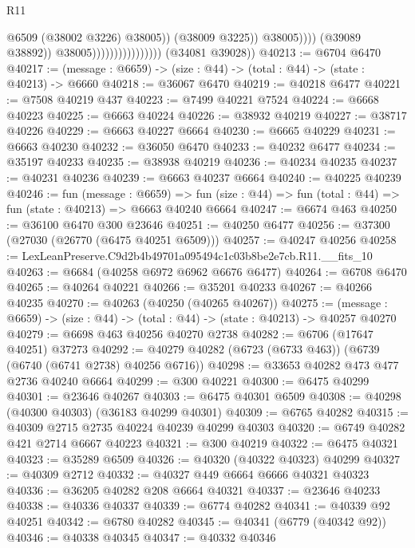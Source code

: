 \begin{lexlean}{R11}
\begin{coremodule}
                                                      @6509
                                                      (@38002 @3226)
                                                      @38005))
                                                  (@38009 @3225))
                                                @38005))))
                                        (@39089 @38892))
                                      @38005))))))))))))))))
      (@34081 @39028))
@40213 := @6704 @6470
@40217 := (message : @6659) -> (size : @44) -> (total : @44) -> (state : @40213) -> @6660
@40218 := @36067 @6470
@40219 := @40218 @6477
@40221 := @7508 @40219 @437
@40223 := @7499 @40221 @7524
@40224 := @6668 @40223
@40225 := @6663 @40224
@40226 := @38932 @40219
@40227 := @38717 @40226
@40229 := @6663 @40227 @6664
@40230 := @6665 @40229
@40231 := @6663 @40230
@40232 := @36050 @6470
@40233 := @40232 @6477
@40234 := @35197 @40233
@40235 := @38938 @40219
@40236 := @40234 @40235
@40237 := @40231 @40236
@40239 := @6663 @40237 @6664
@40240 := @40225 @40239
@40246 := fun (message : @6659) =>
  fun (size : @44) => fun (total : @44) => fun (state : @40213) => @6663 @40240 @6664
@40247 := @6674 @463
@40250 := @36100 @6470 @300 @23646
@40251 := @40250 @6477
@40256 := @37300 (@27030 (@26770 (@6475 @40251 @6509)))
@40257 := @40247 @40256
@40258 := LexLeanPreserve.C9d2b4b49701a095494c1c03b8be2e7cb.R11.__fits_10
@40263 := @6684 (@40258 @6972 @6962 @6676 @6477)
@40264 := @6708 @6470
@40265 := @40264 @40221
@40266 := @35201 @40233
@40267 := @40266 @40235
@40270 := @40263 (@40250 (@40265 @40267))
@40275 := (message : @6659) -> (size : @44) -> (total : @44) -> (state : @40213) -> @40257 @40270
@40279 := @6698 @463 @40256 @40270 @2738
@40282 := @6706 (@17647 @40251) @37273
@40292 := @40279 @40282 (@6723 (@6733 @463)) (@6739 (@6740 (@6741 @2738) @40256 @6716))
@40298 := @33653 @40282 @473 @477 @2736 @40240 @6664
@40299 := @300 @40221
@40300 := @6475 @40299
@40301 := @23646 @40267
@40303 := @6475 @40301 @6509
@40308 := @40298 (@40300 @40303) (@36183 @40299 @40301)
@40309 := @6765 @40282
@40315 := @40309 @2715 @2735 @40224 @40239 @40299 @40303
@40320 := @6749 @40282 @421 @2714 @6667 @40223
@40321 := @300 @40219
@40322 := @6475 @40321
@40323 := @35289 @6509
@40326 := @40320 (@40322 @40323) @40299
@40327 := @40309 @2712
@40332 := @40327 @449 @6664 @6666 @40321 @40323
@40336 := @36205 @40282 @208 @6664 @40321
@40337 := @23646 @40233
@40338 := @40336 @40337
@40339 := @6774 @40282
@40341 := @40339 @92 @40251
@40342 := @6780 @40282
@40345 := @40341 (@6779 (@40342 @92))
@40346 := @40338 @40345
@40347 := @40332 @40346

\end{coremodule}
\end{lexlean}
